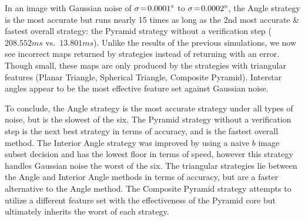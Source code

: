 In an image with Gaussian noise of $\sigma \!=\! 0.0001^\circ$ to $\sigma \!=\! 0.0002^\circ$, the Angle strategy is the most accurate but runs nearly 15 times as long as the 2nd most accurate \& fastest overall strategy: the Pyramid strategy without a verification step ($208.552\si{ms}$ vs.\ $13.801\si{ms}$).
Unlike the results of the previous simulations, we now see incorrect maps returned by strategies instead of returning with an error.
Though small, these maps are only produced by the strategies with triangular features (Planar Triangle, Spherical Triangle, Composite Pyramid).
Interstar angles appear to be the most effective feature set against Gaussian noise.

To conclude, the Angle strategy is the most accurate strategy under all types of noise, but is the slowest of the six.
The Pyramid strategy without a verification step is the next best strategy in terms of accuracy, and is the fastest overall method.
The Interior Angle strategy was improved by using a naive $b$ image subset decision and has the lowest floor in terms of speed, however this strategy handles Gaussian noise the worst of the six. 
The triangular strategies lie between the Angle and Interior Angle methods in terms of accuracy, but are a faster alternative to the Angle method.
The Composite Pyramid strategy attempts to utilize a different feature set with the effectiveness of the Pyramid core but ultimately inherits the worst of each strategy.

\begin{figure}
\end{figure}



